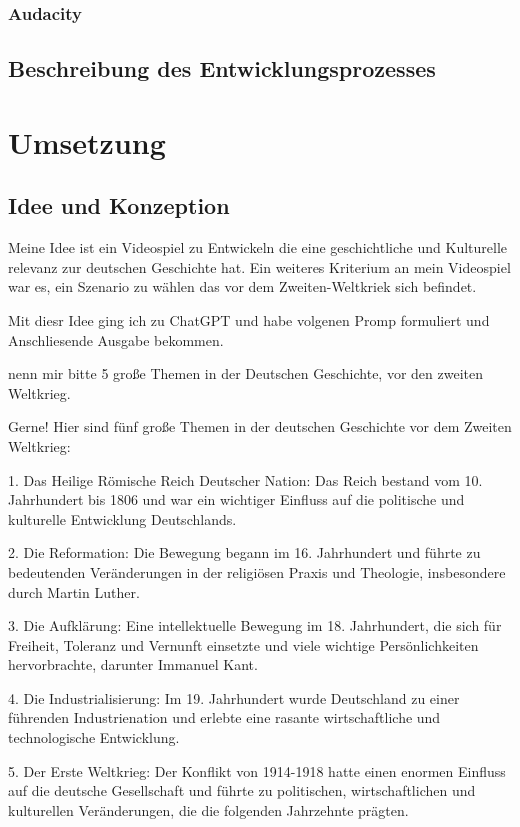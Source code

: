 \documentclass[12pt,a4paper,bibliography=totocnumbered,listof=totocnumbered]{scrartcl}
\begin{document}
\subsubsection{Audacity}

\subsection{Beschreibung des Entwicklungsprozesses}


\section{Umsetzung}
\subsection {Idee und Konzeption}
Meine Idee ist ein Videospiel zu Entwickeln die eine geschichtliche und Kulturelle relevanz zur deutschen Geschichte hat. Ein weiteres Kriterium an mein Videospiel war es, ein Szenario zu wählen das vor dem Zweiten-Weltkriek sich befindet.

Mit diesr Idee ging ich zu ChatGPT und habe volgenen Promp formuliert und Anschliesende Ausgabe bekommen.

nenn mir bitte 5 große Themen in der Deutschen Geschichte, vor den zweiten Weltkrieg.

Gerne! Hier sind fünf große Themen in der deutschen Geschichte vor dem Zweiten Weltkrieg:

1. Das Heilige Römische Reich Deutscher Nation: Das Reich bestand vom 10. Jahrhundert bis 1806 und war ein wichtiger Einfluss auf die politische und kulturelle Entwicklung Deutschlands.

2. Die Reformation: Die Bewegung begann im 16. Jahrhundert und führte zu bedeutenden Veränderungen in der religiösen Praxis und Theologie, insbesondere durch Martin Luther.

3. Die Aufklärung: Eine intellektuelle Bewegung im 18. Jahrhundert, die sich für Freiheit, Toleranz und Vernunft einsetzte und viele wichtige Persönlichkeiten hervorbrachte, darunter Immanuel Kant.

4. Die Industrialisierung: Im 19. Jahrhundert wurde Deutschland zu einer führenden Industrienation und erlebte eine rasante wirtschaftliche und technologische Entwicklung.

5. Der Erste Weltkrieg: Der Konflikt von 1914-1918 hatte einen enormen Einfluss auf die deutsche Gesellschaft und führte zu politischen, wirtschaftlichen und kulturellen Veränderungen, die die folgenden Jahrzehnte prägten.
\end{document}
